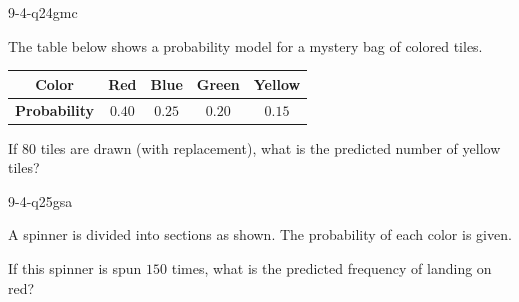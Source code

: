 \begin{practiceQuestion}{9-4-q24}{gmc}
\begin{questionText}
The table below shows a probability model for a mystery bag of colored tiles.

\begin{center}
\begin{tabular}{|c|c|c|c|c|}
\hline
\textbf{Color} & Red & Blue & Green & Yellow \\
\hline
\textbf{Probability} & $0.40$ & $0.25$ & $0.20$ & $0.15$ \\
\hline
\end{tabular}
\end{center}

If $80$ tiles are drawn (with replacement), what is the predicted number of yellow tiles?
\end{questionText}
\end{practiceQuestion}


\begin{practiceQuestion}{9-4-q25}{gsa}
\begin{questionText}
A spinner is divided into sections as shown. The probability of each color is given.

\begin{center}
\end{center}

If this spinner is spun $150$ times, what is the predicted frequency of landing on red?
\end{questionText}
\end{practiceQuestion}

